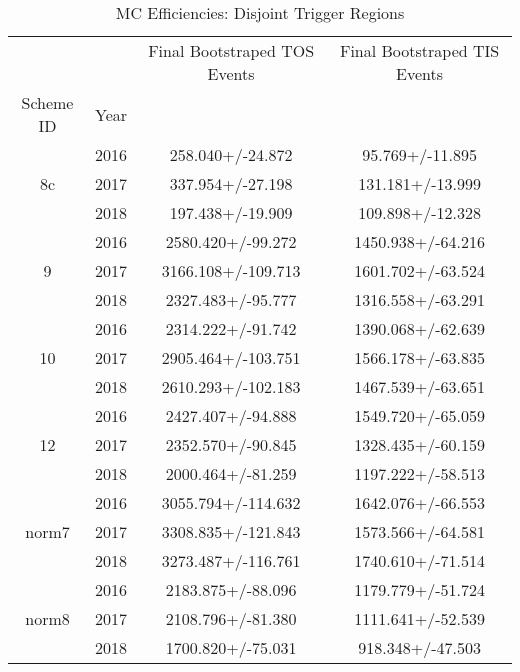 \begin{table}
\centering
\caption{MC Efficiencies: Disjoint Trigger Regions}
\label{tab:tr_2}
\begin{tabular}{cccc}
\toprule
      &      & Final Bootstraped TOS Events & Final Bootstraped TIS Events \\
Scheme ID & Year &                              &                              \\
\midrule
\multirow{3}{*}{8c} & 2016 &             258.040+/-24.872 &              95.769+/-11.895 \\
      & 2017 &             337.954+/-27.198 &             131.181+/-13.999 \\
      & 2018 &             197.438+/-19.909 &             109.898+/-12.328 \\
\cline{1-4}
\multirow{3}{*}{9} & 2016 &            2580.420+/-99.272 &            1450.938+/-64.216 \\
      & 2017 &           3166.108+/-109.713 &            1601.702+/-63.524 \\
      & 2018 &            2327.483+/-95.777 &            1316.558+/-63.291 \\
\cline{1-4}
\multirow{3}{*}{10} & 2016 &            2314.222+/-91.742 &            1390.068+/-62.639 \\
      & 2017 &           2905.464+/-103.751 &            1566.178+/-63.835 \\
      & 2018 &           2610.293+/-102.183 &            1467.539+/-63.651 \\
\cline{1-4}
\multirow{3}{*}{12} & 2016 &            2427.407+/-94.888 &            1549.720+/-65.059 \\
      & 2017 &            2352.570+/-90.845 &            1328.435+/-60.159 \\
      & 2018 &            2000.464+/-81.259 &            1197.222+/-58.513 \\
\cline{1-4}
\multirow{3}{*}{norm7} & 2016 &           3055.794+/-114.632 &            1642.076+/-66.553 \\
      & 2017 &           3308.835+/-121.843 &            1573.566+/-64.581 \\
      & 2018 &           3273.487+/-116.761 &            1740.610+/-71.514 \\
\cline{1-4}
\multirow{3}{*}{norm8} & 2016 &            2183.875+/-88.096 &            1179.779+/-51.724 \\
      & 2017 &            2108.796+/-81.380 &            1111.641+/-52.539 \\
      & 2018 &            1700.820+/-75.031 &             918.348+/-47.503 \\
\bottomrule
\end{tabular}
\end{table}
